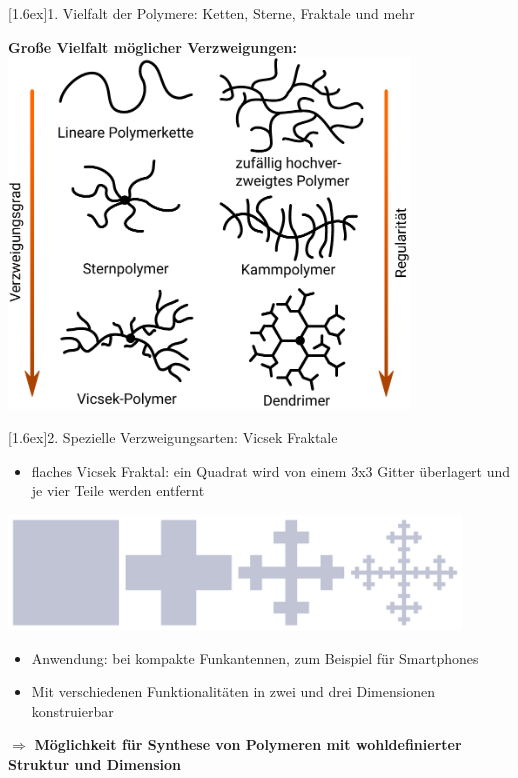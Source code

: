 \documentclass[final]{beamer}
\newlength{\columnheight}
\newlength{\marginw}
\newlength{\tw}
\newlength{\colw}
\newenvironment{myTwoColPoster}{%
  \begin{minipage}[t]{\textwidth}%
    \hspace*{\marginw}%
    \hspace*{9.5bp}%
    \begin{minipage}[t]{\tw}}%
  {\end{minipage}%
   \hspace*{\marginw}%
   \end{minipage}}
\newenvironment{myCol}%
    {\begin{minipage}[t][\columnheight][t]{\colw}}%
    {\end{minipage}}
\newenvironment{textblock}[1]%
    {\begin{block}{\rule[-0.6ex]{0pt}{2.4ex}\raisebox{-0.25ex}[1.6ex]{#1}}%
     \vspace*{5mm}}%
    {\vspace*{5mm}\end{block}}
\begin{document}
\begin{frame}[t]{}
\begin{myTwoColPoster}
\begin{myCol}
\begin{textblock}{1. Vielfalt der Polymere: Ketten, Sterne, Fraktale und mehr}
    \begin{center}
      \textbf{\Large Große Vielfalt möglicher Verzweigungen:}
      \includegraphics[width=0.8\textwidth]{fig/PolymerTypes_DE2}
    \end{center}
  \end{textblock}

  \begin{textblock}{2. Spezielle Verzweigungsarten: Vicsek Fraktale}
    \begin{itemize}\setlength\itemsep{1.4em}\large
      \item flaches Vicsek Fraktal: ein Quadrat wird von einem 3x3 Gitter überlagert und je vier Teile werden entfernt
    \end{itemize}
      \begin{center}
        \includegraphics[width=0.9\textwidth]{fig/vicsek_construction}
      \end{center}
    \begin{itemize}\setlength\itemsep{1.4em}\large
      \item Anwendung: bei kompakte Funkantennen, zum Beispiel für Smartphones 
      \item Mit verschiedenen Funktionalitäten in zwei und drei Dimensionen konstruierbar
    \end{itemize}
    \vspace*{3cm}
    $\Rightarrow$ \textbf{\textcolor{IPForange}{\Large Möglichkeit für Synthese von Polymeren mit wohldefinierter Struktur und Dimension}}
  \end{textblock}


\end{myCol}
\end{myTwoColPoster}
\end{frame}
\end{document}
